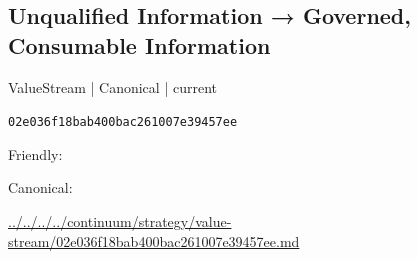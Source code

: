 \documentclass[10pt,a4paper]{article}
\begin{document}
\subsection*{Unqualified Information → Governed, Consumable Information}
{\small ValueStream | Canonical | current}\par
\texttt{02e036f18bab400bac261007e39457ee}\par
Friendly: \par
Canonical: \par
{\footnotesize\url{../../../../continuum/strategy/value-stream/02e036f18bab400bac261007e39457ee.md}}\par
\end{document}
